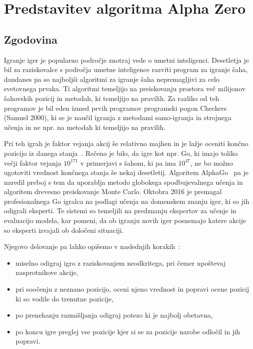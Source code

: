 \documentclass[a4paper, 12pt]{book}
\begin{document}
\chapter{Predstavitev algoritma Alpha Zero}
\label{alphazero}
\section{Zgodovina}

Igranje iger je popularno področje znotraj vede o umetni inteligenci. 
Desetletja je bil za raziskovalce s področja umetne inteligence razviti program za igranje šaha, dandanes pa so najboljši algoritmi za igranje šaha nepremagljivi za celo svetovnega prvaka.
Ti algoritmi temeljijo na preiskovanju prostora več milijonov šahovskih pozicij in metodah, ki temeljijo na pravilih.
Za razliko od teh programov je bil eden izmed prvih programov programski pogon Checkers (Samuel 2000), ki se je naučil igranja z metodami samo-igranja in strojnega učenja in ne npr. na metodah ki temeljijo na pravilih.

Pri teh igrah je faktor vejanja akcij še relativno majhen in je lažje oceniti končno pozicijo iz danega stanja~\cite{wiki:AlphaGo}.
Rečeno je bilo, da igre kot npr. Go, ki imajo toliko večji faktor vejanja $10^{171}$ v primerjavi s šahom, ki pa ima $10^{47}$, ne bo možno ugotoviti vrednost končnega stanja še nekaj desetletij.
Algoritem AlphaGo~\cite{silver2016mastering} pa je naredil preboj s tem da uporablja metodo globokega spodbujevalnega učenja in algoritem drevesno preiskovanje Monte Carlo. 
Oktobra 2016 je premagal profesionalnega Go igralca na podlagi učenja na domenskem znanju iger, ki so jih odigrali eksperti.
Te sistemi so temeljili na predznanju ekspertov za učenje in evaluacijo modela, kar pomeni, da ob igranju novih iger posnemajo katere akcije so eksperti izvajali ob določeni situaciji.

Njegovo delovanje pa lahko opišemo v naslednjih korakih~\cite{guid}:
\begin{itemize}
	\item miselno odigraj igro z raziskovanjem neodkritega, pri čemer upoštevaj nasprotnikove akcije,
	\item pri soočenju z neznano pozicijo, oceni njeno vrednost in popravi ocene pozicij ki so vodile do trenutne pozicije,
	\item po prenehanju razmišljanja odigraj potezo ki je najbolj obetavna,
	\item po koncu igre preglej vse pozicije kjer si se za pozicije narobe odločil in jih popravi.
\end{itemize}
\end{document}
